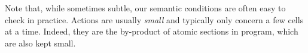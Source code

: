 



Note that, while sometimes subtle, our semantic conditions are often easy to check in practice. Actions are usually \emph{small} and typically only concern a few cells at a time. Indeed, they are the by-product of atomic sections in program, which are also kept small.
